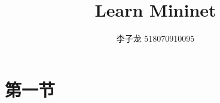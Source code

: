 \documentclass[UTF8]{ctexart}
\author{李子龙 518070910095}
\providecommand{\code}[2][]{}
\begin{document}
    \title{Learn Mininet}
    \maketitle
    \tableofcontents
    \clearpage
    \section{第一节}
    \code{lab02/task1.py}
\end{document}
